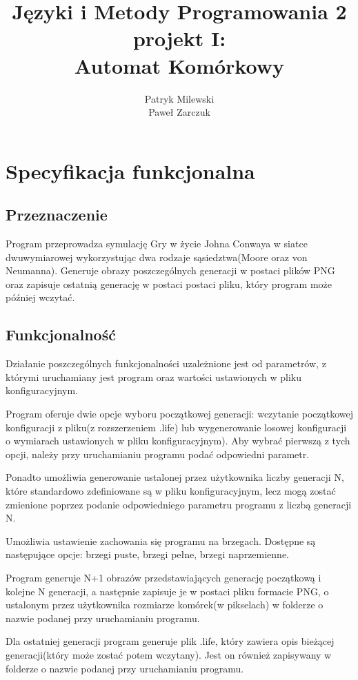 \documentclass[a4paper,12pt,twoside]{article}
\title{Języki i Metody Programowania 2 projekt I:\\Automat Komórkowy}
\author{Patryk Milewski \\Paweł Zarczuk }
\begin{document}
\maketitle

\section{Specyfikacja funkcjonalna}

\subsection{Przeznaczenie}

Program przeprowadza symulację Gry w życie Johna Conwaya w siatce dwuwymiarowej wykorzystując dwa rodzaje sąsiedztwa(Moore oraz von Neumanna). Generuje obrazy poszczególnych generacji w postaci plików PNG oraz zapisuje ostatnią generację w postaci postaci pliku, który program może później wczytać.

\subsection{Funkcjonalność}
Działanie poszczególnych funkcjonalności uzależnione jest od parametrów, z którymi uruchamiany jest program oraz wartości ustawionych w pliku konfiguracyjnym.

Program oferuje dwie opcje wyboru początkowej generacji: wczytanie początkowej konfiguracji z pliku(z rozszerzeniem  .life) lub wygenerowanie losowej konfiguracji o wymiarach ustawionych w pliku konfiguracyjnym). Aby wybrać pierwszą z tych opcji, należy przy uruchamianiu programu podać odpowiedni parametr.
 
Ponadto umożliwia generowanie ustalonej przez użytkownika liczby generacji N, które standardowo zdefiniowane są w pliku konfiguracyjnym, lecz mogą zostać zmienione poprzez podanie odpowiedniego parametru programu z liczbą generacji N.

Umożliwia ustawienie zachowania się programu na brzegach. Dostępne są następujące opcje: brzegi puste, brzegi pełne, brzegi naprzemienne.

Program generuje N+1 obrazów przedstawiających generację początkową i  kolejne N generacji, a następnie zapisuje je w postaci pliku formacie PNG, o ustalonym przez użytkownika rozmiarze komórek(w pikselach) w folderze o nazwie podanej przy uruchamianiu programu. 

Dla ostatniej generacji program generuje plik .life, który zawiera opis bieżącej generacji(który może zostać potem wczytany). Jest on również zapisywany w folderze o nazwie podanej przy uruchamianiu programu.
\end{document}
